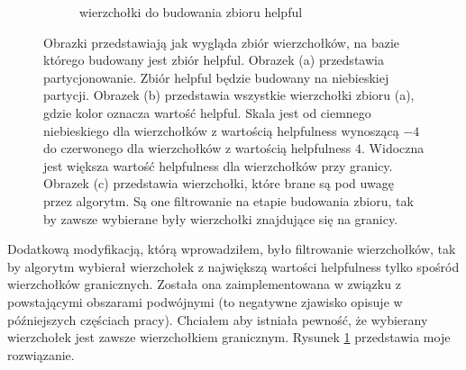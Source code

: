 \begin{figure}[h]
\begin{subfigure}{.32\textwidth}
    \caption[short]{wierzchołki do budowania zbioru helpful}
\end{subfigure}
\caption{Obrazki przedstawiają jak wygląda zbiór wierzchołków, na bazie którego budowany jest zbiór helpful.
Obrazek (a) przedstawia partycjonowanie. Zbiór helpful będzie budowany na niebieskiej partycji.
Obrazek (b) przedstawia wszystkie wierzchołki zbioru (a), gdzie kolor oznacza wartość helpful. Skala jest od
ciemnego niebieskiego dla wierzchołków z wartością helpfulness wynoszącą $-4$ do czerwonego dla wierzchołków z
wartością helpfulness $4$. Widoczna jest większa wartość helpfulness dla wierzchołków przy granicy. Obrazek (c)
przedstawia wierzchołki, które brane są pod uwagę przez algorytm. Są one filtrowanie na etapie budowania zbioru,
tak by zawsze wybierane były wierzchołki znajdujące się na granicy.}
\label{im:building_helpfulsets}
\end{figure}

Dodatkową modyfikacją, którą wprowadziłem, było filtrowanie wierzchołków, tak by algorytm wybierał wierzchołek z największą
wartości helpfulness tylko spośród wierzchołków granicznych.
Została ona zaimplementowana w związku z powstającymi obszarami podwójnymi
(to negatywne zjawisko opisuje w późniejszych częściach pracy).
Chciałem aby istniała pewność, że wybierany wierzchołek jest zawsze wierzchołkiem granicznym.
Rysunek \ref{im:building_helpfulsets} przedstawia moje rozwiązanie.